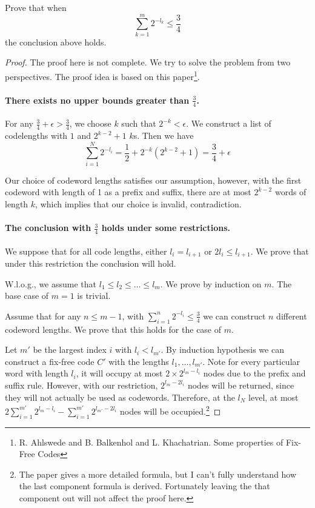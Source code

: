 \begin{exercise}{ Prove that when
  $$\sum_{k=1}^{m} 2^{-l_{k}} \leq \frac{3}{4}$$  the conclusion above holds.}
  \begin{proof} The proof here is not complete. We try to solve the problem from two perspectives. The proof idea is based on this paper\footnote{R. Ahlswede and B. Balkenhol and L. Khachatrian. Some properties of Fix-Free Codes}.
    \paragraph{There exists no upper bounds greater than $\frac{3}{4}$.} For any $\frac{3}{4}+\epsilon>\frac{3}{4}$, we choose $k$ such that $2^{-k}<\epsilon$. We construct a list of codelengths with $1$ and $2^{k-2}+1$ $k$s. Then we have
    \begin{equation}
      \sum_{i=1}^{N} 2^{-l_i} = \frac{1}{2}+ 2^{-k} (2^{k-2}+1) = \frac{3}{4}+\epsilon
    \end{equation}

    Our choice of codeword lengths satisfies our assumption, however, with the first codeword with length of 1 as a prefix and suffix, there are at most $2^{k-2}$ words of length $k$, which implies that our choice is invalid, contradiction. 

    \paragraph{The conclusion with $\frac{3}{4}$ holds under some restrictions.} We suppose that for all code lengths, either $l_i = l_{i+1}$ or $2l_i \le l_{i+1}$. We prove that under this restriction the conclusion will hold.

    W.l.o.g., we assume that $l_1 \le l_2 \le \ldots \le l_m$. We prove by induction on $m$. The base case of $m=1$ is trivial.

    Assume that for any $n\le m-1$, with $\sum_{i=1}^{n} 2^{-l_i} \le \frac{3}{4}$ we can construct $n$ different codeword lengths. We prove that this holds for the case of $m$.
    
    Let $m'$ be the largest index $i$ with $l_i < l_{m'}$. By induction hypothesis we can construct a fix-free code $C'$ with the lengths $l_1, \ldots, l_{m'}$. Note for every particular word with length $l_i$, it will occupy at most $2\times 2^{l_{m}-l_i}$ nodes due to the prefix and suffix rule. However, with our restriction, $2^{l_m - 2l_i}$ nodes will be returned, since they will not actually be used as codewords. Therefore, at the $l_N$ level, at most $2 \sum_{i=1}^{m'} 2^{l_m-l_i}- \sum_{i=1}^{m'}2^{l_{m'} - 2l_i}$ nodes will be occupied.\footnote{The paper gives a more detailed formula, but I can't fully understand how the last component formula is derived. Fortunately leaving the that component out will not affect the proof here. }


\end{proof}
\end{exercise}
